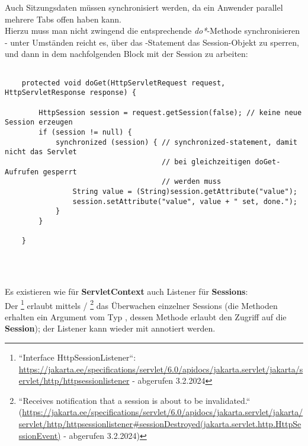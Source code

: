 \begin{tcolorbox}[enlarge top by=0.5cm,enlarge bottom by=0.5cm]
Auch Sitzungsdaten müssen synchronisiert werden, da ein Anwender parallel mehrere Tabs offen haben kann.\\
Hierzu muss man nicht zwingend die entsprechende \textit{do*}-Methode synchronisieren - unter Umständen reicht es, über das -Statement das Session-Objekt zu sperren, und dann in dem nachfolgenden Block mit der Session zu arbeiten:

\begin{verbatim}

    protected void doGet(HttpServletRequest request, HttpServletResponse response) {

        HttpSession session = request.getSession(false); // keine neue Session erzeugen
        if (session != null) {
            synchronized (session) { // synchronized-statement, damit nicht das Servlet
                                     // bei gleichzeitigen doGet-Aufrufen gesperrt
                                     // werden muss
                String value = (String)session.getAttribute("value");
                session.setAttribute("value", value + " set, done.");
            }
        }

    }

\end{verbatim}\\

\end{tcolorbox}\\

\noindent
Es existieren wie für \textbf{ServletContext} auch Listener für \textbf{Sessions}:\\
Der \footnote{
    ``Interface HttpSessionListener``: \url{https://jakarta.ee/specifications/servlet/6.0/apidocs/jakarta.servlet/jakarta/servlet/http/httpsessionlistener} - abgerufen 3.2.2024
} erlaubt mittels  / \footnote{``Receives notification that a session is about to be invalidated.`` (\url{https://jakarta.ee/specifications/servlet/6.0/apidocs/jakarta.servlet/jakarta/servlet/http/httpsessionlistener#sessionDestroyed(jakarta.servlet.http.HttpSessionEvent)} - abgerufen 3.2.2024)} das Überwachen einzelner Sessions (die Methoden erhalten ein Argument vom Typ , dessen Methode  erlaubt den Zugriff auf die \textbf{Session}); der Listener kann wieder mit  annotiert werden.

